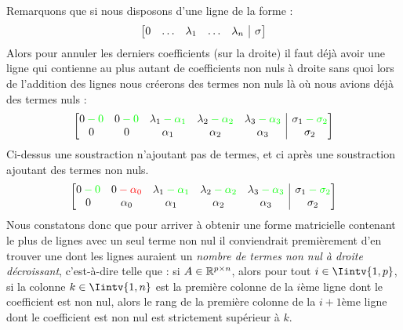 \noindent Remarquons que si nous disposons d'une ligne de la forme :
$$ 
\left[
\begin{array}{@{}ccccc|c@{}}
0 & \ldots & \lambda_1 & \ldots & \lambda_n & \sigma \\
\end{array}
\right]
$$
\noindent Alors pour annuler les derniers coefficients (sur la droite) il faut déjà avoir une ligne qui contienne au plus autant de coefficients non nuls à droite sans quoi lors de l'addition des lignes nous créerons des termes non nuls là où nous avions déjà des termes nuls :
$$ 
\left[
\begin{array}{@{}ccccc|c@{}}
0 \color{green} -0  & 0\color{green} -0 & \lambda_1 \color{green} -\alpha_1 & \lambda_2 \color{green} -\alpha_2 & \lambda_3\color{green} -\alpha_3 & \sigma_1\color{green} -\sigma_2 \\
0 & 0  & \alpha_1 & \alpha_2 & \alpha_3 & \sigma_2 \\
\end{array}
\right]
$$
Ci-dessus une soustraction n'ajoutant pas de termes, et ci après une soustraction ajoutant des termes non nuls.
$$ 
\left[
\begin{array}{@{}ccccc|c@{}}
0 \color{green} -0  & 0\color{red} -\alpha_0 & \lambda_1 \color{green} -\alpha_1 & \lambda_2 \color{green} -\alpha_2 & \lambda_3\color{green} -\alpha_3 & \sigma_1\color{green} -\sigma_2 \\
0 & \alpha_0  & \alpha_1 & \alpha_2 & \alpha_3 & \sigma_2 \\
\end{array}
\right]
$$
Nous constatons donc que pour arriver à obtenir une forme matricielle contenant le plus de lignes avec un seul terme non nul il conviendrait premièrement d'en trouver une dont les lignes auraient un \textit{nombre de termes non nul à droite décroissant}, c'est-à-dire telle que : si $A \in \mathbb{R}^{p \times n}$, alors pour tout $i \in \Iintv{1,p}$, si la colonne $k\in \Iintv{1,n}$ est la première colonne de la $i$ème ligne dont le coefficient est non nul, alors le rang de la première colonne de la $i+1$ème ligne dont le coefficient est non nul est strictement supérieur à $k$. \\


